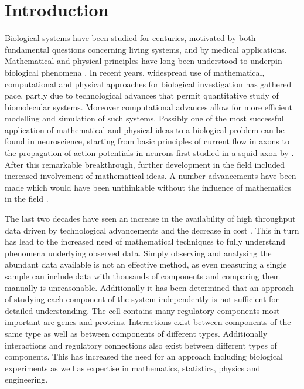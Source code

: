 
\chapter{Introduction}
\label{cha:introduction}

Biological systems have been studied for centuries, motivated by both fundamental questions concerning living systems, and by medical applications. Mathematical and physical principles have long been understood to underpin biological phenomena \citep{Lotka:1925tu, Rashevsky:1935jt}. In recent years,  widespread use of mathematical, computational and physical approaches for biological investigation has gathered pace, partly due to technological advances that permit quantitative study of biomolecular systems. Moreover computational advances allow for more efficient modelling and simulation of such systems.
Possibly one of the most successful application of mathematical and physical ideas to a biological problem can be found in neuroscience, starting from basic principles of current flow in axons to the propagation of action potentials in neurons first studied in a
squid axon by \cite{Hodgkin:1952td}. After this remarkable breakthrough, further development in the field included increased involvement of mathematical ideas. A number advancements have been made which would have been unthinkable without the influence of mathematics in the field \citep{Amari201348}.

The last two decades have seen an increase in the availability of high throughput data driven by technological advancements and the decrease in cost \citep{Schadt:2010dp}. This in turn has lead to the increased need of mathematical techniques to fully understand phenomena underlying observed data. Simply observing and analysing the abundant data available is not an effective method,
as even measuring a single sample can include data with thousands of components and comparing them manually is unreasonable.
Additionally it has been determined that an approach of studying each component of the system independently is not sufficient for detailed understanding.
The cell contains many regulatory components most important are genes and proteins. Interactions exist between components of the same type as well as between components of different types.
Additionally  interactions and regulatory connections also exist between different types of components. This has increased the need for an approach including biological experiments as well as expertise in mathematics, statistics, physics and engineering.


